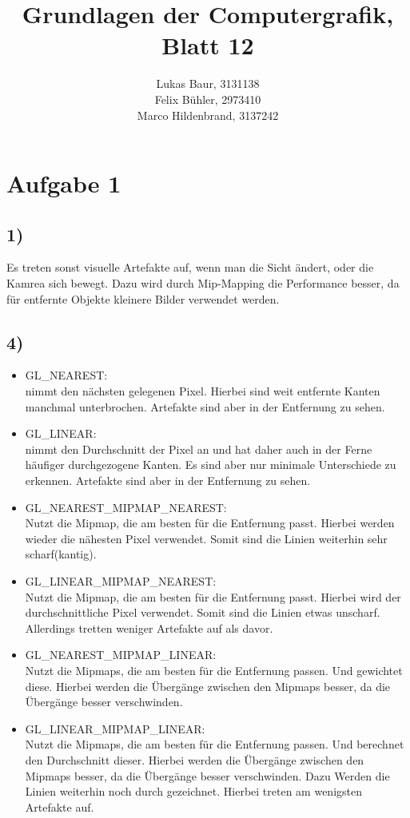 \documentclass[12pt,pdftex,a4paper]{article}
\begin{document}
\title{ Grundlagen der Computergrafik,\\ Blatt 12}
\author{Lukas Baur, 3131138\\
		Felix Bühler, 2973410\\
		Marco Hildenbrand, 3137242}
\maketitle
\section*{Aufgabe 1}
\subsection*{1)}
Es treten sonst visuelle Artefakte auf, wenn man die Sicht ändert, oder die Kamrea sich bewegt. Dazu wird durch Mip-Mapping die Performance besser, da für entfernte Objekte kleinere Bilder verwendet werden.

\subsection*{4)}
\begin{itemize}
	\item GL\_NEAREST:\\
	nimmt den nächsten gelegenen Pixel. Hierbei sind weit entfernte Kanten manchmal unterbrochen. Artefakte sind aber in der Entfernung zu sehen.
	\item GL\_LINEAR:\\
	nimmt den Durchschnitt der Pixel an und hat daher auch in der Ferne häufiger durchgezogene Kanten. Es sind aber nur minimale Unterschiede zu erkennen. Artefakte sind aber in der Entfernung zu sehen.
	\item GL\_NEAREST\_MIPMAP\_NEAREST:\\
	Nutzt die Mipmap, die am besten für die Entfernung passt. Hierbei werden wieder die nähesten Pixel verwendet. Somit sind die Linien weiterhin sehr scharf(kantig).
	\item GL\_LINEAR\_MIPMAP\_NEAREST:\\
	Nutzt die Mipmap, die am besten für die Entfernung passt. Hierbei wird der durchschnittliche Pixel verwendet. Somit sind die Linien etwas unscharf. Allerdings tretten weniger Artefakte auf als davor.
	\item GL\_NEAREST\_MIPMAP\_LINEAR:\\
	Nutzt die Mipmaps, die am besten für die Entfernung passen. Und gewichtet diese. Hierbei werden die Übergänge zwischen den Mipmaps besser, da die Übergänge besser verschwinden.
	\item GL\_LINEAR\_MIPMAP\_LINEAR:\\
	Nutzt die Mipmaps, die am besten für die Entfernung passen. Und berechnet den Durchschnitt dieser. Hierbei werden die Übergänge zwischen den Mipmaps besser, da die Übergänge besser verschwinden. Dazu Werden die Linien weiterhin noch durch gezeichnet. Hierbei treten am wenigsten Artefakte auf.
\end{itemize}
\end{document}
